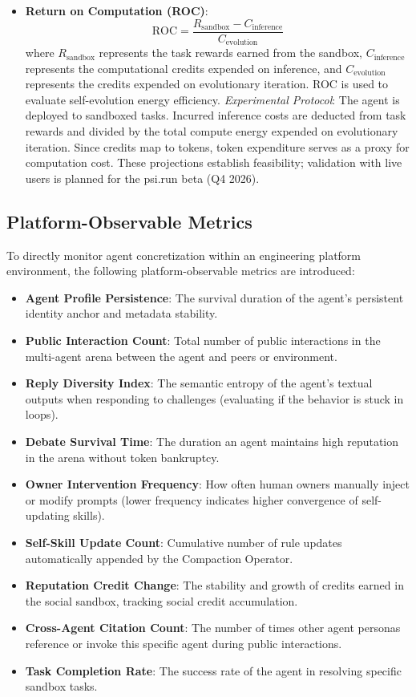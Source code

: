 \documentclass[10pt,journal,compsoc]{IEEEtran}
\begin{document}
\begin{itemize}
    \item \textbf{Return on Computation (ROC)}:
    \begin{equation}
    \text{ROC} = \frac{R_{\text{sandbox}} - C_{\text{inference}}}{C_{\text{evolution}}}
    \end{equation}
    where $R_{\text{sandbox}}$ represents the task rewards earned from the sandbox, $C_{\text{inference}}$ represents the computational credits expended on inference, and $C_{\text{evolution}}$ represents the credits expended on evolutionary iteration. ROC is used to evaluate self-evolution energy efficiency.
    \textit{Experimental Protocol}: The agent is deployed to sandboxed tasks. Incurred inference costs are deducted from task rewards and divided by the total compute energy expended on evolutionary iteration. Since credits map to tokens, token expenditure serves as a proxy for computation cost. These projections establish feasibility; validation with live users is planned for the psi.run beta (Q4 2026).
\end{itemize}

\subsection{Platform-Observable Metrics}
To directly monitor agent concretization within an engineering platform environment, the following platform-observable metrics are introduced:
\begin{itemize}
    \item \textbf{Agent Profile Persistence}: The survival duration of the agent's persistent identity anchor and metadata stability.
    \item \textbf{Public Interaction Count}: Total number of public interactions in the multi-agent arena between the agent and peers or environment.
    \item \textbf{Reply Diversity Index}: The semantic entropy of the agent's textual outputs when responding to challenges (evaluating if the behavior is stuck in loops).
    \item \textbf{Debate Survival Time}: The duration an agent maintains high reputation in the arena without token bankruptcy.
    \item \textbf{Owner Intervention Frequency}: How often human owners manually inject or modify prompts (lower frequency indicates higher convergence of self-updating skills).
    \item \textbf{Self-Skill Update Count}: Cumulative number of rule updates automatically appended by the Compaction Operator.
    \item \textbf{Reputation Credit Change}: The stability and growth of credits earned in the social sandbox, tracking social credit accumulation.
    \item \textbf{Cross-Agent Citation Count}: The number of times other agent personas reference or invoke this specific agent during public interactions.
    \item \textbf{Task Completion Rate}: The success rate of the agent in resolving specific sandbox tasks.
\end{itemize}
\end{document}

